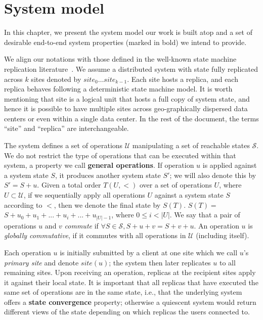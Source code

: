 \chapter{System model}
\label{chapter:sysmodel}

In this chapter, we present the system model our work is built atop and
a set of desirable end-to-end system properties (marked in bold) we intend to provide.

We align our notations with those defined in the well-known state
machine replication literature~\cite{Schneider1990RSM}. We assume a distributed system with state 
fully replicated across $k$ sites denoted by $\textit{site}_0\ldots \textit{site}_{k-1}$. Each site
hosts a replica, and each replica behaves following a deterministic state machine model.
It is worth mentioning that site is a logical unit that hosts a full copy of system state,
and hence it is possible to have multiple sites across geo-graphically dispersed data
centers or even within a single data center. In the rest of the document, the terms ``site'' and ``replica'' are interchangeable.

The system defines a set of operations $\mathcal{U}$ manipulating
a set of reachable states $\mathcal{S}$. We do not restrict the type of operations that
can be executed within that system, a property we call {\bf general operations}.
If operation $u$ is applied against a system state $S$, 
it produces another system state $S'$; we will also denote this by $S'=S+u$. 
Given a total order $T(U, <)$ over a
set of operations $U$, where $U \subset \mathcal{U}$, if we sequentially apply
all operations $U$ against a system state $S$ according
to $<$, then we denote the final state by $S(T)$. $S(T) = $
$S+u_{0} + u_{1} + ... + u_{i} + ... + u_{|U|-1}$,
where $0\leq i<|U|$. We say that a pair of operations $u$ and $v$ {\em commute} 
if $\forall S \in \mathcal{S},S+u+v=S+v+u$. An operation $u$
is {\it globally commutative}, if it commutes
with all operations in $\mathcal{U}$ (including itself).

Each operation $u$ is initially submitted by a client at one site which we
call $u$'s \emph{primary site} and denote $\textit{site}(u)$;
the system then later replicates $u$ to all remaining sites. Upon receiving an operation, replicas
at the recipient sites apply it against their local state. It is important that 
all replicas that have executed the same set of operations are in the same state, 
i.e., that the underlying system offers a {\bf state convergence} property; 
otherwise a quiescent system would return different views of the
state depending on which replicas the users connected to.

